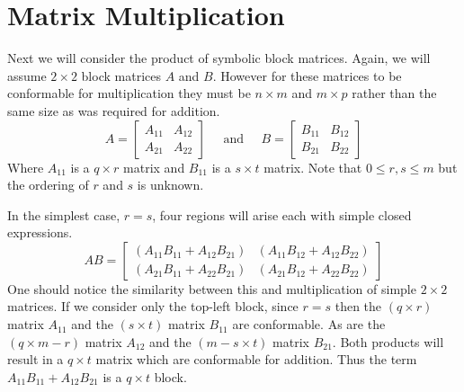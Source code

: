 \section{Matrix Multiplication}


Next we will consider the product of symbolic block matrices.
Again, we will assume $2 \times 2$ block matrices $A$ and $B$.
However for these matrices to be conformable for multiplication they must be  $n \times m$ and $m \times p$ rather than
the same size as was required for addition.
\begin{equation}
	A = \begin{bmatrix} A_{11} & A_{12} \\ A_{21} & A_{22} \end{bmatrix}
	\;\;\;\;\; \text{and} \;\;\;\;\;
	B = \begin{bmatrix} B_{11} & B_{12} \\ B_{21} & B_{22} \end{bmatrix}
\end{equation}
Where $A_{11}$ is a $q \times r$ matrix and $B_{11}$ is a $s \times t$ matrix.
Note that $0 \leq r , s \leq m$ but the ordering of $r$ and $s$ is unknown.


In the simplest case, $r=s$, four regions will arise each with simple closed expressions. 
\begin{equation}
	AB = \begin{bmatrix}
		\left( A_{11}B_{11}+A_{12}B_{21} \right) & \left( A_{11}B_{12}+A_{12}B_{22} \right) \\ 
		\left( A_{21}B_{11}+A_{22}B_{21} \right) & \left( A_{21}B_{12}+A_{22}B_{22} \right)
	\end{bmatrix}
\end{equation}
One should notice the similarity between this and multiplication of simple $2 \times 2$ matrices.
If we consider only the top-left block, since $r=s$ then the $(q \times r)$ matrix $A_{11}$ and the 
$(s \times t)$ matrix $B_{11}$ are conformable.
As are the $(q \times m-r)$ matrix $A_{12}$ and the $(m-s \times t)$ matrix $B_{21}$.
Both products will result in a $q \times t$ matrix which are conformable for addition.
Thus the term $A_{11}B_{11} + A_{12}B_{21}$ is a $q \times t$ block. 


